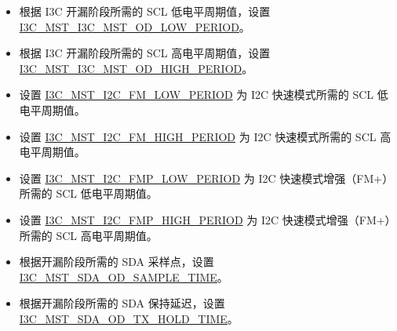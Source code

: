 \documentclass[main\_\_CN.tex]{subfiles}
\begin{document}
\begin{itemize}
\begin{itemize}
          \begin{itemize}
              \item 根据 I3C 开漏阶段所需的 SCL 低电平周期值，设置 \hyperref[fielddesc:I3CMSTREGI3CMSTODLOWPERIOD]{I3C\_MST\_I3C\_MST\_OD\_LOW\_PERIOD}。
              \item 根据 I3C 开漏阶段所需的 SCL 高电平周期值，设置 \hyperref[fielddesc:I3CMSTREGI3CMSTODHIGHPERIOD]{I3C\_MST\_I3C\_MST\_OD\_HIGH\_PERIOD}。
              \item 设置 \hyperref[fielddesc:I3CMSTREGI2CFMLOWPERIOD]{I3C\_MST\_I2C\_FM\_LOW\_PERIOD} 为 I2C 快速模式所需的 SCL 低电平周期值。
              \item 设置 \hyperref[fielddesc:I3CMSTREGI2CFMHIGHPERIOD]{I3C\_MST\_I2C\_FM\_HIGH\_PERIOD} 为 I2C 快速模式所需的 SCL 高电平周期值。
              \item 设置 \hyperref[fielddesc:I3CMSTREGI2CFMPLOWPERIOD]{I3C\_MST\_I2C\_FMP\_LOW\_PERIOD} 为 I2C 快速模式增强（FM+）所需的 SCL 低电平周期值。
              \item 设置 \hyperref[fielddesc:I3CMSTREGI2CFMPHIGHPERIOD]{I3C\_MST\_I2C\_FMP\_HIGH\_PERIOD} 为 I2C 快速模式增强（FM+）所需的 SCL 高电平周期值。
              \item 根据开漏阶段所需的 SDA 采样点，设置 \hyperref[fielddesc:I3CMSTREGSDAODSAMPLETIME]{I3C\_MST\_SDA\_OD\_SAMPLE\_TIME}。
              \item 根据开漏阶段所需的 SDA 保持延迟，设置 \hyperref[fielddesc:I3CMSTREGSDAODTXHOLDTIME]{I3C\_MST\_SDA\_OD\_TX\_HOLD\_TIME}。
          \end{itemize}


\end{itemize}
\end{itemize}
\end{document}
